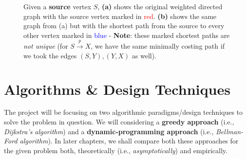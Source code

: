 \documentclass[a4paper, 12pt]{report}
\theoremstyle{definition}
\begin{document}
\begin{figure}[H]
\begin{subfigure}[t]{0.4\textwidth}
    \caption{\text{\hspace{-0.5cm}}} \label{fig2:b}   
    \end{subfigure}
    \caption{Given a \textbf{source} vertex \(S\), \textbf{(a)} shows the original weighted directed graph with the source vertex marked in \textcolor{red}{red}. \textbf{(b)} shows the same graph from (a) but with the shortest path from the source to every other vertex marked in \textcolor{blue}{blue} - \textbf{Note}: these marked shortest paths are \emph{not unique} (for $S \xrightarrow{p} X$, we have the same minimally costing path if we took the edges \((S, Y), (Y, X)\) as well).\cite{cormenBk}}
\end{figure}

\chapter{Algorithms \& Design Techniques}
\label{chap:3}
The project will be focusing on two algorithmic paradigms/design techniques to solve the problem in question. We will considering a \textbf{greedy approach} (i.e., \textit{Dijkstra's algorithm}) and a \textbf{dynamic-programming approach} (i.e., \textit{Bellman-Ford algorithm}).
In later chapters, we shall compare both these approaches for the given problem both, theoretically (i.e., \emph{asymptotically}) and empirically.
\end{document}
